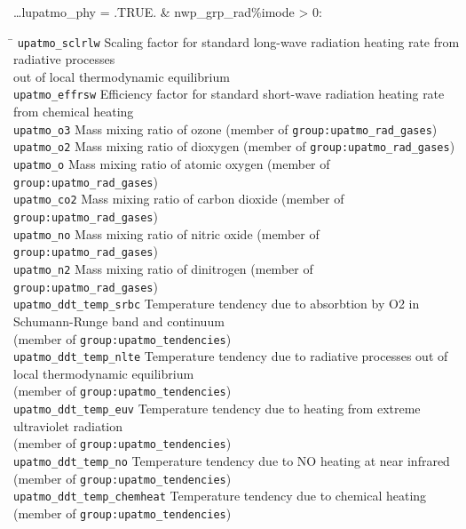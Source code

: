 \ldots lupatmo\_phy = .TRUE. \& nwp\_grp\_rad\%imode > 0:
\begin{tabbing}
\hspace*{0.4\textwidth} \= \kill
\texttt{upatmo\_sclrlw}  \> Scaling factor for standard long-wave radiation heating rate  
from radiative processes \\
                         \> out of local thermodynamic equilibrium \\
\texttt{upatmo\_effrsw}  \> Efficiency factor for standard short-wave radiation heating rate  
from chemical heating \\
\texttt{upatmo\_o3}      \> Mass mixing ratio of ozone (member of \texttt{group:upatmo\_rad\_gases}) \\
\texttt{upatmo\_o2}      \> Mass mixing ratio of dioxygen (member of \texttt{group:upatmo\_rad\_gases}) \\
\texttt{upatmo\_o}       \> Mass mixing ratio of atomic oxygen (member of \texttt{group:upatmo\_rad\_gases}) \\
\texttt{upatmo\_co2}     \> Mass mixing ratio of carbon dioxide (member of \texttt{group:upatmo\_rad\_gases}) \\
\texttt{upatmo\_no}      \> Mass mixing ratio of nitric oxide (member of \texttt{group:upatmo\_rad\_gases}) \\
\texttt{upatmo\_n2}      \> Mass mixing ratio of dinitrogen (member of \texttt{group:upatmo\_rad\_gases}) \\
\texttt{upatmo\_ddt\_temp\_srbc}  \> Temperature tendency due to
absorbtion by O2 in Schumann-Runge band and continuum \\ 
                                  \> (member of \texttt{group:upatmo\_tendencies}) \\
\texttt{upatmo\_ddt\_temp\_nlte}  \> Temperature tendency due to 
radiative processes out of local thermodynamic equilibrium \\
                                  \> (member of \texttt{group:upatmo\_tendencies}) \\
\texttt{upatmo\_ddt\_temp\_euv}   \> Temperature tendency due to 
heating from extreme ultraviolet radiation \\
                                  \> (member of \texttt{group:upatmo\_tendencies}) \\
\texttt{upatmo\_ddt\_temp\_no}    \> Temperature tendency due to 
NO heating at near infrared (member of \texttt{group:upatmo\_tendencies}) \\
\texttt{upatmo\_ddt\_temp\_chemheat}   \> Temperature tendency due to 
chemical heating (member of \texttt{group:upatmo\_tendencies}) 
\end{tabbing}



